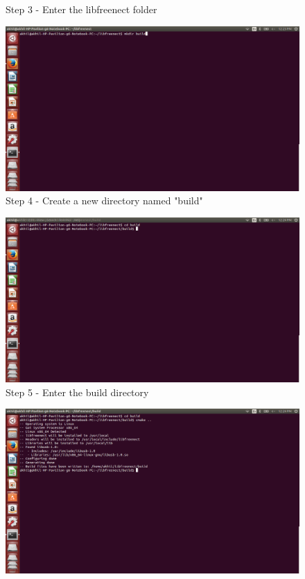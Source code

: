 \begin{flushleft}
\begin{figure}
\begin{center}
\end{center}
\caption{Step 3 - Enter the libfreenect folder}
\label{fig:w12}
\end{figure}
\medskip
\begin{figure}
\begin{center}
\includegraphics[scale=0.35]{step4}
\end{center}
\caption{Step 4 - Create a new directory named "build"}
\label{fig:w13}
\end{figure}
\medskip
\begin{figure}
\begin{center}
\includegraphics[scale=0.35]{step5}
\end{center}
\caption{Step 5 - Enter the build directory}
\label{fig:w14}
\end{figure}
\medskip
\begin{figure}
\begin{center}
\includegraphics[scale=0.35]{step6}

\end{center}
\end{figure}
\end{flushleft}
